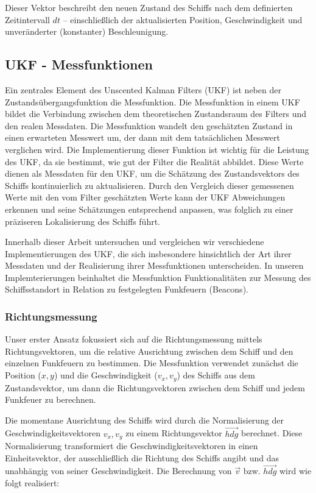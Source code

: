 \documentclass[conference]{IEEEtran}[10pt]
\begin{document}
Dieser Vektor beschreibt den neuen Zustand des Schiffs nach dem definierten Zeitintervall \(dt\) -- einschließlich der aktualisierten Position, Geschwindigkeit und unveränderter (konstanter) Beschleunigung.



\subsection{UKF - Messfunktionen}

Ein zentrales Element des Unscented Kalman Filters (UKF) ist neben der Zustandsübergangsfunktion die Messfunktion. Die Messfunktion in einem UKF bildet die Verbindung zwischen dem theoretischen Zustandsraum des Filters und den realen Messdaten. Die Messfunktion wandelt den geschätzten Zustand in einen erwarteten Messwert um, der dann mit dem tatsächlichen Messwert verglichen wird. Die Implementierung dieser Funktion ist wichtig für die Leistung des UKF, da sie bestimmt, wie gut der Filter die Realität abbildet. Diese Werte dienen als Messdaten für den UKF, um die Schätzung des Zustandsvektors des Schiffs kontinuierlich zu aktualisieren. Durch den Vergleich dieser gemessenen Werte mit den vom Filter geschätzten Werte kann der UKF Abweichungen erkennen und seine Schätzungen entsprechend anpassen, was folglich zu einer präziseren Lokalisierung des Schiffs führt.

Innerhalb dieser Arbeit untersuchen und vergleichen wir verschiedene Implementierungen des UKF, die sich insbesondere hinsichtlich der Art ihrer Messdaten und der Realisierung ihrer Messfunktionen unterscheiden.
In unseren Implemterierungen beinhaltet die Messfunktion Funktionalitäten zur Messung des Schiffsstandort in Relation zu festgelegten Funkfeuern (Beacons).


\subsubsection{Richtungsmessung}

Unser erster Ansatz fokussiert sich auf die Richtungsmessung mittels Richtungsvektoren, um die relative Ausrichtung zwischen dem Schiff und den einzelnen Funkfeuern zu bestimmen. Die Messfunktion verwendet zunächst die Position (\(x, y\)) und die Geschwindigkeit (\(v_x, v_y\)) des Schiffs aus dem Zustandsvektor, um dann die Richtungsvektoren zwischen dem Schiff und jedem Funkfeuer zu berechnen.

Die momentane Ausrichtung des Schiffs wird durch die Normalisierung der Geschwindigkeitsvektoren \(v_x, v_y\) zu einem Richtungsvektor \(\vec{hdg}\) berechnet. Diese Normalisierung transformiert die Geschwindigkeitsvektoren in einen Einheitsvektor, der ausschließlich die Richtung des Schiffs angibt und das unabhängig von seiner Geschwindigkeit. Die Berechnung von \(\vec{v}\) bzw. \(\vec{hdg}\) wird wie folgt realisiert:
\end{document}
